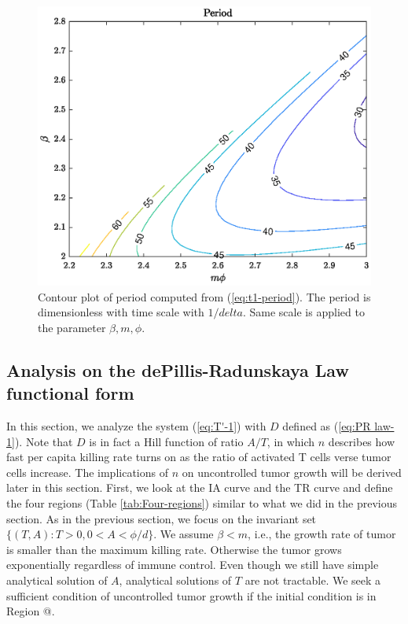 \documentclass[review,authoryear]{elsarticle}
\makeatletter
\newcommand*{\rom}[1]{\expandafter\@slowromancap\romannumeral #1@}
\makeatother
\begin{document}
\begin{figure}
\includegraphics[width=0.9\linewidth]{figs/DA-period-contour}
\caption{\label{fig:Contour-plot-of-period}Contour plot of period computed
from (\ref{eq:t1-period}). The period is dimensionless with time scale
with $1/delta$. Same scale is applied to the parameter $\beta,m,\phi$. }
\end{figure}


\subsection{Analysis on the dePillis-Radunskaya Law functional form}

In this section, we analyze the system (\ref{eq:T'-1}) with $D$
defined as (\ref{eq:PR law-1}). Note that $D$ is in fact a Hill
function of ratio $A/T$, in which $n$ describes how fast per capita
killing rate turns on as the ratio of activated T cells verse tumor cells increase.
The implications of $n$ on uncontrolled tumor growth will be derived later in this section.
First, we look at the IA curve and the TR curve and define the four
regions (Table \ref{tab:Four-regions}) similar to what we did in
the previous section. As in the previous section, we focus on the
invariant set $\{(T,A):T>0,0<A<\phi/d\}$. We assume $\beta<m$, i.e.,
the growth rate of tumor is smaller than the maximum killing rate.
Otherwise the tumor grows exponentially regardless of immune control.
Even though we still have simple analytical solution of $A$, analytical
solutions of $T$ are not tractable. We seek a sufficient condition
of uncontrolled tumor growth if the initial condition is in Region \rom{2}. 
\end{document}
